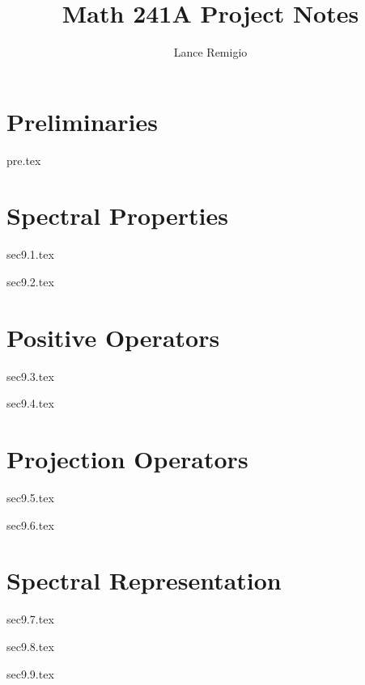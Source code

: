 \documentclass[a4paper]{report}
\title{Math 241A Project Notes}
\author{Lance Remigio}
\begin{document}
\maketitle
\chapter{Preliminaries}

{pre.tex}

\chapter{Spectral Properties}

{sec9.1.tex}

{sec9.2.tex}

\chapter{Positive Operators}

{sec9.3.tex}

{sec9.4.tex}

\chapter{Projection Operators}

{sec9.5.tex}

{sec9.6.tex}

\chapter{Spectral Representation}

{sec9.7.tex}

{sec9.8.tex}

{sec9.9.tex}
\end{document}
